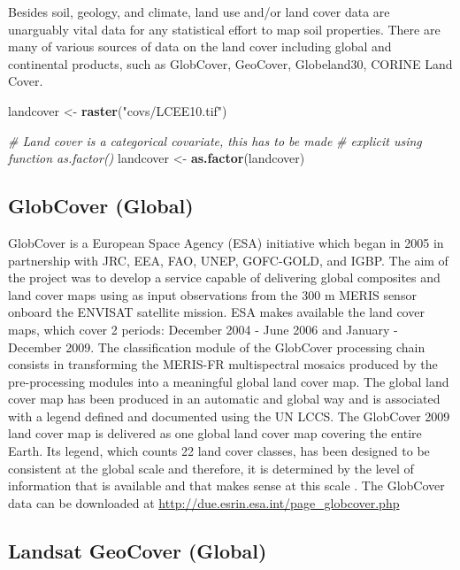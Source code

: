\documentclass[10pt,b5paper,]{book}
\newenvironment{Shaded}{\begin{snugshade}}{\end{snugshade}}
\newcommand{\CommentTok}[1]{\textcolor[rgb]{0.56,0.35,0.01}{\textit{#1}}}
\newcommand{\KeywordTok}[1]{\textcolor[rgb]{0.13,0.29,0.53}{\textbf{#1}}}
\newcommand{\NormalTok}[1]{#1}
\newcommand{\StringTok}[1]{\textcolor[rgb]{0.31,0.60,0.02}{#1}}
\theoremstyle{definition}
\theoremstyle{definition}
\theoremstyle{definition}
\theoremstyle{remark}
\begin{document}
Besides soil, geology, and climate, land use and/or land cover data are
unarguably vital data for any statistical effort to map soil properties.
There are many of various sources of data on the land cover including
global and continental products, such as GlobCover, GeoCover,
Globeland30, CORINE Land Cover.

\begin{Shaded}
\begin{Highlighting}[]
\NormalTok{landcover <-}\StringTok{ }\KeywordTok{raster}\NormalTok{(}\StringTok{"covs/LCEE10.tif"}\NormalTok{)}

\CommentTok{# Land cover is a categorical covariate, this has to be made }
\CommentTok{# explicit using function as.factor()}
\NormalTok{landcover <-}\StringTok{ }\KeywordTok{as.factor}\NormalTok{(landcover)}
\end{Highlighting}
\end{Shaded}

\hypertarget{globcover-global}{%
\subsection{GlobCover (Global)}\label{globcover-global}}

GlobCover is a European Space Agency (ESA) initiative which began in
2005 in partnership with JRC, EEA, FAO, UNEP, GOFC-GOLD, and IGBP. The
aim of the project was to develop a service capable of delivering global
composites and land cover maps using as input observations from the 300
m MERIS sensor onboard the ENVISAT satellite mission. ESA makes
available the land cover maps, which cover 2 periods: December 2004 -
June 2006 and January - December 2009. The classification module of the
GlobCover processing chain consists in transforming the MERIS-FR
multispectral mosaics produced by the pre-processing modules into a
meaningful global land cover map. The global land cover map has been
produced in an automatic and global way and is associated with a legend
defined and documented using the UN LCCS. The GlobCover 2009 land cover
map is delivered as one global land cover map covering the entire Earth.
Its legend, which counts 22 land cover classes, has been designed to be
consistent at the global scale and therefore, it is determined by the
level of information that is available and that makes sense at this
scale \citep{bontemps2011globcover}. The GlobCover data can be
downloaded at \url{http://due.esrin.esa.int/page_globcover.php}

\hypertarget{landsat-geocover-global}{%
\subsection{Landsat GeoCover (Global)}\label{landsat-geocover-global}}
\end{document}
